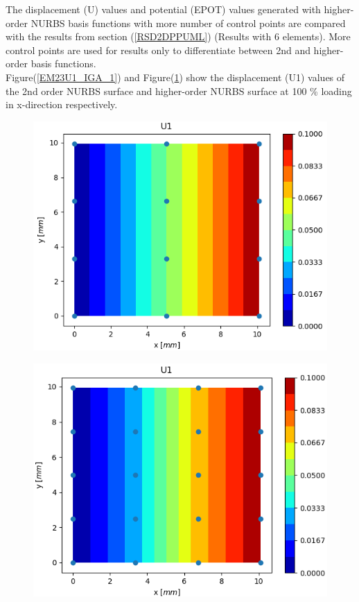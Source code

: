 \documentclass[11pt]{article}
\begin{document}
The displacement (U) values and potential (EPOT) values generated with higher-order NURBS basis functions with more number of control points are compared with the results from section (\ref{RSD2DPPUML}) (Results with 6 elements).
More control points are used for results only to differentiate between 2nd and higher-order basis functions.
\\
Figure(\ref{EM23U1_IGA_1}) and Figure(\ref{HEM12U1_IGA}) show the displacement (U1) values of the 2nd order NURBS surface and higher-order NURBS surface at 100 \% loading in x-direction respectively. \\
\begin{figure}[H]
	\centering
	\begin{minipage}{.5\textwidth}
		\centering
		\includegraphics[width=1\linewidth]{EM23U1_IGA.png}
		\label{EM23U1_IGA_1}
	\end{minipage}%
	\begin{minipage}{.5\textwidth}
		\centering
		\includegraphics[width=1\linewidth]{HEM12U1_IGA.png}
		\label{HEM12U1_IGA}
	\end{minipage}
\end{figure}
\end{document}
